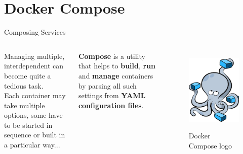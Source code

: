 
\section{Docker Compose}
\graphicspath{{figs/section3/}}

\begin{frame}{Composing Services}
\begin{columns}
  Managing multiple, interdependent  can become quite a tedious task.\\
  Each container may take multiple options, some have to be started in sequence or built in a particular way...\\
  \begin{block}{}
    \centering
    \textbf{Compose} is a utility that helps to \textbf{build}, \textbf{run} and \textbf{manage} containers by parsing all such settings from \textbf{YAML configuration files}.
  \end{block}

  \begin{figure}
    \centering
    \includegraphics[scale=.2]{composeLogo.png}
    \label{fig:compose}
    \caption{Docker Compose logo}
  \end{figure}
\end{columns}
\end{frame}
